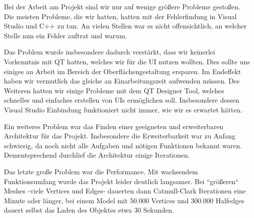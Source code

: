 
Bei der Arbeit am Projekt sind wir nur auf wenige grö\ss{}ere Probleme gesto\ss{}en. 
Die meisten Probleme, die wir hatten, hatten mit der Fehlerfindung in Visual Studio und C++ zu tun. 
An vielen Stellen war es nicht offensichtlich, an welcher Stelle nun ein Fehler auftrat und warum. 

Das Problem wurde insbesondere dadurch verstärkt, dass wir keinerlei Vorkenntnis mit QT hatten, welches wir für die UI nutzen wollten. 
Dies sollte uns einiges an Arbeit im Bereich der Oberflächengestaltung ersparen.
Im Endeffekt haben wir vermutlich das gleiche an Einarbeitungszeit aufwenden müssen. 
Des Weiteren hatten wir einige Probleme mit dem QT Designer Tool, welches schnelles und einfaches erstellen von UIs ermöglichen soll. 
Insbesondere dessen Visual Studio Einbindung funktioniert nicht immer, wie wir es erwartet hätten. 

Ein weiteres Problem war das Finden einer geeigneten und erweiterbaren Architektur für das Projekt. 
Insbesondere die Erweiterbarkeit war zu Anfang schwierig, da noch nicht alle Aufgaben und nötigen Funktionen bekannt waren.
Dementsprechend durchlief die Architektur einige Iterationen.

Das letzte gro\ss{}e Problem war die Performance. 
Mit wachsendem Funktionsumfang wurde das Projekt leider deutlich langsamer. 
Bei ``grö\ss{}eren`` Meshes -viele Vertices und Edges- dauerten dann Catmull-Clark Iterationen eine Minute oder länger, bei einem Model mit 50.000 Vertices und 300.000 Halfedges dauert selbst das Laden des Objektes etwa 30 Sekunden.
